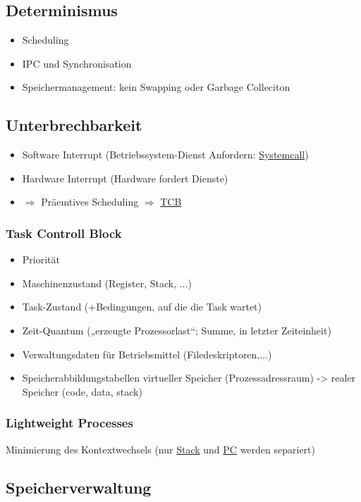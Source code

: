 \subsection{Determinismus}
\begin{itemize}
	\item Scheduling
	\item IPC und Synchronisation
	\item Speichermanagement: kein Swapping oder Garbage Colleciton
\end{itemize}

\subsection{Unterbrechbarkeit}
\begin{itemize}
	\item Software Interrupt (Betriebssystem-Dienst Anfordern: \underline{Systemcall})
	\item Hardware Interrupt (Hardware fordert Dienste)
	\item $\Rightarrow$ Präemtives Scheduling $\Rightarrow$ \underline{TCB}
\end{itemize}

\subsubsection{Task Controll Block}
\begin{itemize}
	\item Priorität
	\item Maschinenzustand (Register, Stack, ...)
	\item Task-Zustand (+Bedingungen, auf die die Task wartet)
	\item Zeit-Quantum („erzeugte Prozessorlast“; Summe, in letzter Zeiteinheit)
	\item Verwaltungsdaten für Betriebsmittel (Filedeskriptoren,...)
	\item Speicherabbildungstabellen virtueller Speicher (Prozessadressraum) ->
realer Speicher (code, data, stack)
\end{itemize}

\subsubsection{Lightweight Processes}
Minimierung des Kontextwechsels (nur \underline{Stack} und \underline{PC} werden separiert)

\subsection{Speicherverwaltung}
